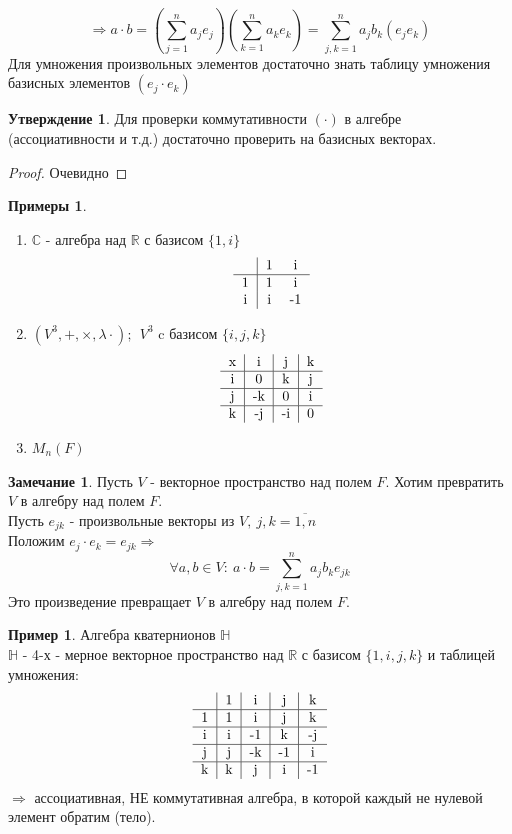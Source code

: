 \documentclass[a4paper, 12pt]{article}
\newcommand{\R}{\mathbb R}
\newcommand\tab[1][.5cm]{\hspace*{#1}}
\theoremstyle{definition}
\newtheorem*{subtheorem}{Утверждение}
\newtheorem*{remark}{Замечание}
\newtheorem*{example}{Примеры}
\newtheorem*{example1}{Пример}
\begin{document}
  $$\Longrightarrow a \cdot b = (\sum \limits_{j=1}^na_je_j)(\sum \limits_{k=1}^na_ke_k) = \sum \limits_{j,k=1}^na_jb_k(e_je_k)$$ 
  Для умножения произвольных элементов достаточно знать таблицу умножения базисных элементов $(e_j \cdot e_k)$ 
  \begin{subtheorem}
    Для проверки коммутативности $(\cdot)$ в алгебре (ассоциативности и т.д.) достаточно проверить на базисных векторах. 
  \end{subtheorem} 
  \begin{proof}
    Очевидно
  \end{proof}
  \begin{example}\tab
    \begin{enumerate}
      \item $\mathbb{C}$ - алгебра над $\R$ с базисом $\{1, i\}$
      $$\begin{tabular}{c|cc}
        \null & 1 & i \\ \hline
        1 & 1 & i \\
        i & i & -1
      \end{tabular}$$
      \item $(V^3, +, \times, \lambda \cdot); \  \ V^3$ c базисом $\{i, j, k\}$
      $$\begin{tabular}{c|c|c|c}
        x & i & j & k \\ \hline
        i & 0 & k & j \\ \hline
        j & -k & 0 & i \\ \hline
        k & -j & -i & 0
      \end{tabular}$$
      \item $M_n(F)$
    \end{enumerate}
  \end{example}
  \begin{remark}
    Пусть $V$ - векторное пространство над полем $F$.
  Хотим превратить $V$ в алгебру над полем $F$. \\
  Пусть $e_{jk}$ - произвольные векторы из $V, \ j,k = \overline{1, n}$ \\
  Положим $e_j \cdot e_k = e_{jk} \Longrightarrow $ $$\forall a, b\in V: \ a\cdot b=\sum \limits_{j,k=1}^na_jb_ke_{jk}$$
  Это произведение превращает $V$ в алгебру над полем $F$.  
  \end{remark} 
  \begin{example1}
    Алгебра кватернионов $\mathbb{H}$ \\
    $\mathbb{H}$ - 4-х - мерное векторное пространство над $\R$ с базисом $\{1, i, j, k\}$ и таблицей умножения:
    $$\begin{tabular}{c|c|c|c|c}
        \null & 1 & i & j & k \\ \hline
        1 & 1 & i & j & k \\ \hline
        i & i & -1 & k & -j \\ \hline
        j & j & -k & -1 & i \\ \hline
        k & k & j & i & -1
      \end{tabular}$$
      $\Longrightarrow $ ассоциативная, НЕ коммутативная алгебра, в которой каждый не нулевой элемент обратим (тело).  
  \end{example1}
\end{document}
